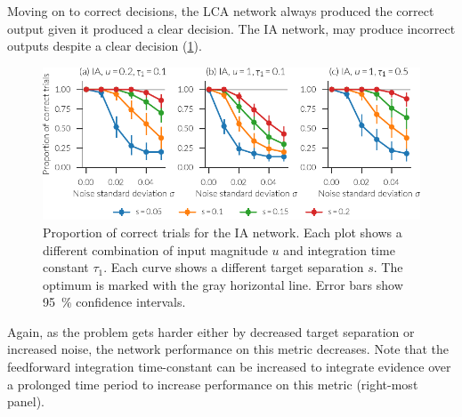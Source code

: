 Moving on to correct decisions, the LCA network always produced the correct output given it produced a clear decision.
The IA network, may produce incorrect outputs despite a clear decision (\cref{fig:ia-correct}).
\begin{figure}
    \centering
    \includegraphics{figures/ia-correct}
    \caption[Proportion of correct trials for the IA network.]{Proportion of correct trials for the IA network. Each plot shows a different combination of input magnitude $u$ and integration time constant $\tau_1$. Each curve shows a different target separation $s$. The optimum is marked with the gray horizontal line. Error bars show \SI{95}{\percent} confidence intervals.}\label{fig:ia-correct}
\end{figure}
Again, as the problem gets harder either by decreased target separation or increased noise, the network performance on this metric decreases.
Note that the feedforward integration time-constant can be increased to integrate evidence over a prolonged time period  to increase performance on this metric (right-most panel).

